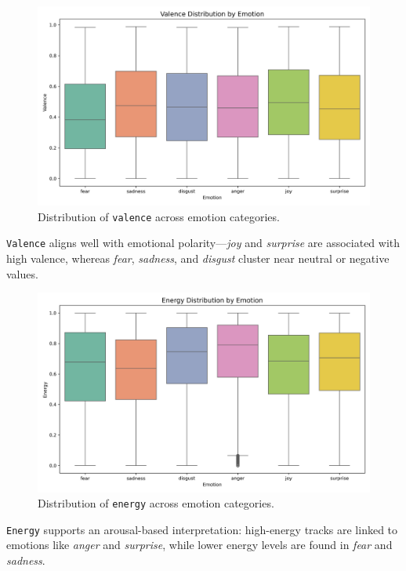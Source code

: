 \documentclass{article}
\begin{document}
\begin{figure}[H]
\centering
\includegraphics[width=\textwidth]{Graphics/feature_by_emotion/valence_by_emotion_boxplot.png}
\caption{Distribution of \texttt{valence} across emotion categories.}
\label{fig:valence_emotion}
\end{figure}

\texttt{Valence} aligns well with emotional polarity—\textit{joy} and \textit{surprise} are associated with high valence, whereas \textit{fear}, \textit{sadness}, and \textit{disgust} cluster near neutral or negative values.

\begin{figure}[H]
\centering
\includegraphics[width=\textwidth]{Graphics/feature_by_emotion/energy_by_emotion_boxplot.png}
\caption{Distribution of \texttt{energy} across emotion categories.}
\label{fig:energy_emotion}
\end{figure}

\texttt{Energy} supports an arousal-based interpretation: high-energy tracks are linked to emotions like \textit{anger} and \textit{surprise}, while lower energy levels are found in \textit{fear} and \textit{sadness}.
\end{document}
